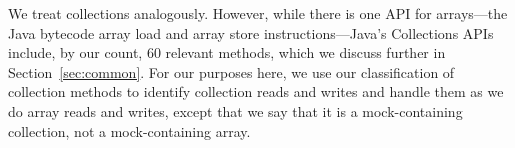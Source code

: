 
We treat collections analogously. However, while there is one API for arrays---the Java bytecode array load and array store instructions---Java's Collections APIs include, by our count, 60 relevant methods, which we discuss further in Section~\ref{sec:common}. For our purposes here, we use our classification of collection methods to identify collection reads and writes and handle them as we do array reads and writes, except that we say that it is a mock-containing collection, not a mock-containing array.


